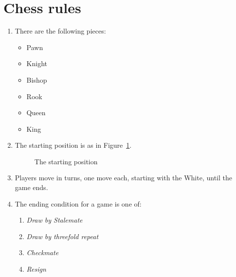 \section{Chess rules}

\begin{enumerate}
\item There are the following pieces:
  \begin{itemize}
  \item Pawn \pawn
  \item Knight \knight
  \item Bishop \bishop
  \item Rook \rook
  \item Queen \queen
  \item King \king
  \end{itemize}
\item The starting position is as in Figure~\ref{fig:reset}.
  \begin{figure}
    \centering
    \newgame\showboard
    \caption{The starting position}
    \label{fig:reset}
  \end{figure}
\item Players move in turns, one move each, starting with the White,
  until the game ends.
\item The ending condition for a game is one of:
  \begin{enumerate}
  \item \emph{Draw by Stalemate}
  \item \emph{Draw by threefold repeat} 
  \item \emph{Checkmate}
  \item \emph{Resign}
  \end{enumerate}
\end{enumerate}

